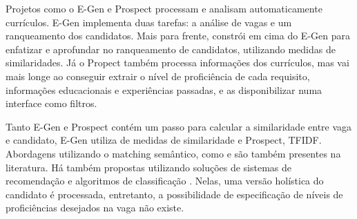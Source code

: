 \documentclass[preprint,12pt]{elsarticle}
\begin{document}


Projetos como o E-Gen \cite{e-gen-job-processing-2007} e Prospect \cite{Singh2010PROSPECTAS} processam e analisam automaticamente currículos. E-Gen implementa duas tarefas: a análise de vagas e um ranqueamento dos candidatos. Mais para frente, \cite{improve-ranking-candidates-2009} constrói em cima do E-Gen \cite{e-gen-job-processing-2007} para enfatizar e aprofundar no ranqueamento de candidatos, utilizando medidas de similaridades. Já o Propect também processa informações dos currículos, mas vai mais longe ao conseguir extrair o nível de proficiência de cada requisito, informações educacionais e experiências passadas, e as disponibilizar numa interface como filtros.

Tanto E-Gen e Prospect contém um passo para calcular a similaridade entre vaga e candidato, E-Gen utiliza de medidas de similaridade e Prospect, TFIDF. Abordagens utilizando o matching semântico, como \cite{impact-semantic-web-2005} e \cite{impact-semantic-web-2005} são também presentes na literatura. Há também propostas utilizando soluções de sistemas de recomendação \cite{needle-haystack-recommender-systems} e algoritmos de classificação \cite{poch-etal-2014-ranking}. Nelas, uma versão holística do candidato é processada, entretanto, a possibilidade de especificação de níveis de proficiências desejados na vaga não existe.



\end{document}
